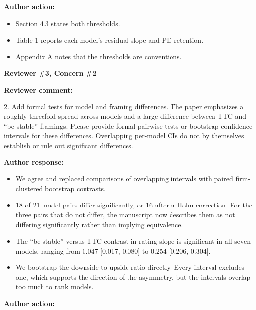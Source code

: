 \documentclass[11pt]{article}
\newcommand{\rvcomment}[1]{{\color{ReviewerGreen}#1}}
\newcommand{\concern}[1]{\textbf{\color{ReviewerGreen}#1}}
\begin{document}
\textbf{Author action:}

\begin{itemize}

\item Section 4.3 states both thresholds.

\item Table 1 reports each model's residual slope and PD retention.

\item Appendix A notes that the thresholds are conventions.

\end{itemize}

\vspace{12pt}
\concern{Reviewer \#3, Concern \#2}

\concern{Reviewer comment:}

\rvcomment{2. Add formal tests for model and framing differences. The paper emphasizes a roughly threefold spread across models and a large difference between TTC and ``be stable'' framings. Please provide formal pairwise tests or bootstrap confidence intervals for these differences. Overlapping per-model CIs do not by themselves establish or rule out significant differences.}

\textbf{Author response:}

\begin{itemize}

\item We agree and replaced comparisons of overlapping intervals with paired firm-clustered bootstrap contrasts.

\item 18 of 21 model pairs differ significantly, or 16 after a Holm correction. For the three pairs that do not differ, the manuscript now describes them as not differing significantly rather than implying equivalence.

\item The ``be stable'' versus TTC contrast in rating slope is significant in all seven models, ranging from 0.047 [0.017, 0.080] to 0.254 [0.206, 0.304].

\item We bootstrap the downside-to-upside ratio directly. Every interval excludes one, which supports the direction of the asymmetry, but the intervals overlap too much to rank models.

\end{itemize}

\textbf{Author action:}
\end{document}
